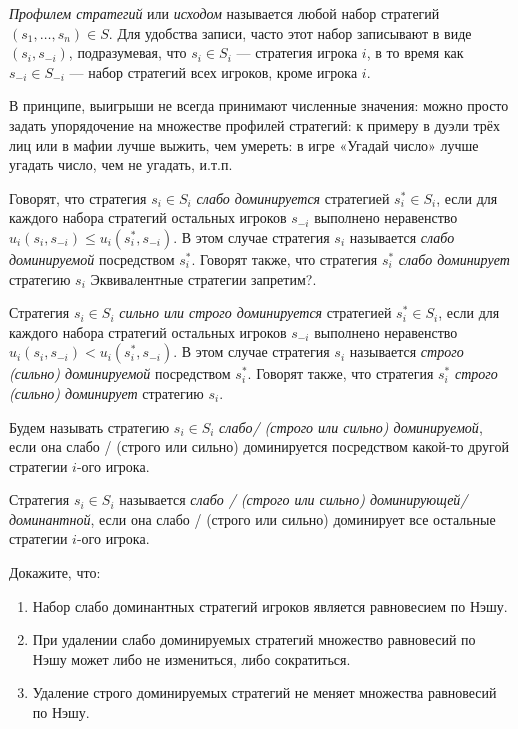 {\it Профилем стратегий}  или {\it исходом} называется любой набор стратегий $(s_1,\ldots,s_n) \in S $. Для удобства записи, часто этот набор записывают в виде $(s_i,s_{-i})$, подразумевая, что $s_i \in S_i$ — стратегия игрока $i$, в то время как  $s_{-i} \in S_{-i}$ — набор стратегий всех игроков, кроме игрока $i$.

В принципе, выигрыши не всегда принимают численные значения: можно просто задать упорядочение на множестве профилей стратегий: к примеру в дуэли трёх лиц или в мафии лучше выжить, чем умереть: в игре «Угадай число» лучше угадать число, чем не угадать, и.т.п.

Говорят, что стратегия $s_i \in S_i$ {\it слабо доминируется} стратегией $s^*_i \in S_i$, если для каждого набора стратегий остальных игроков $s_{-i}$ выполнено неравенство $u_i(s_i,s_{-i}) \leq u_i(s^*_i,s_{-i}).$ В этом случае стратегия $s_i$ называется {\it слабо доминируемой} посредством $s^*_i$. Говорят также, что стратегия $s^*_i$ {\it слабо доминирует} стратегию $s_i$ {\red Эквивалентные стратегии запретим?}.

Стратегия $s_i \in S_i$ {\it сильно или строго доминируется} стратегией $s^*_i \in S_i$, если для каждого набора стратегий остальных игроков $s_{-i}$ выполнено неравенство $u_i(s_i,s_{-i}) < u_i(s^*_i,s_{-i}).$ В этом случае стратегия $s_i$ называется {\it строго (сильно) доминируемой} посредством $s^*_i$. Говорят также, что стратегия $s^*_i$ {\it строго (сильно) доминирует} стратегию $s_i$.

Будем называть стратегию  $s_i \in S_i$ {\it слабо/ (строго или сильно) доминируемой}, если она слабо / (строго или сильно) доминируется посредством какой-то другой стратегии $i$-ого игрока.

Стратегия $s_i \in S_i$ называется {\it слабо / (строго или сильно) доминирующей/доминантной}, если она слабо / (строго или сильно) доминирует все остальные стратегии $i$-ого игрока.

\begin{problem} Докажите, что:
\begin{enumerate}
\item Набор слабо доминантных стратегий игроков является равновесием по Нэшу.
\item При удалении слабо доминируемых стратегий множество равновесий по Нэшу может либо не измениться, либо сократиться.
\item Удаление строго доминируемых стратегий не меняет множества равновесий по Нэшу.
\end{enumerate}
\end{problem}

